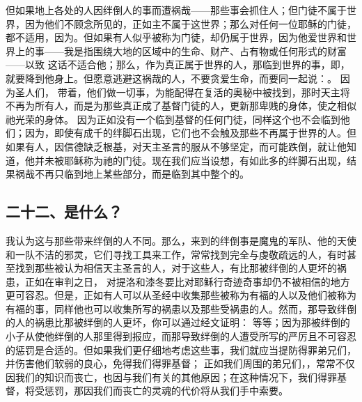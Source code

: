 但如果地上各处的人因绊倒人的事而遭祸哉——那些事会抓住人；但门徒不属于世界，因为他们不顾念所见的，正如主不属于这世界；那么对任何一位耶稣的门徒，都不适用，因为。但如果有人似乎被称为门徒，却仍属于世界，因为他爱世界和世界上的事——我是指围绕大地的区域中的生命、财产、占有物或任何形式的财富——以致 这话不适合他；那么，作为真正属于世界的人，那临到世界的事，即，就要降到他身上。但愿意逃避这祸哉的人，不要贪爱生命，而要同一起说：。 因为圣人们， 带着，他们做一切事，为能配得在复活的奥秘中被找到，那时天主将不再为所有人，而是为那些真正成了基督门徒的人，更新那卑贱的身体，使之相似祂光荣的身体。 因为正如没有一个临到基督的任何门徒，同样这个也不会临到他们；因为，即使有成千的绊脚石出现，它们也不会触及那些不再属于世界的人。但如果有人，因信德缺乏根基，对天主圣言的服从不够坚定，而可能跌倒，就让他知道，他并未被耶稣称为祂的门徒。现在我们应当设想，有如此多的绊脚石出现，结果祸哉不再只临到地上某些部分，而是临到其中整个的。\par


\subsection{二十二、是什么？}

 我认为这与那些带来绊倒的人不同。那么，来到的绊倒事是魔鬼的军队、他的天使和一队不洁的邪灵，它们寻找工具来工作，常常找到完全与虔敬疏远的人，有时甚至找到那些被认为相信天主圣言的人，对于这些人，有比那被绊倒的人更坏的祸患，正如在审判之日， 对提洛和漆冬要比对耶稣行奇迹奇事却仍不被相信的地方更可容忍。但是，正如有人可以从圣经中收集那些被称为有福的人以及他们被称为有福的事，同样他也可以收集所写的祸患以及那些受祸患的人。然而，那导致绊倒的人的祸患比那被绊倒的人更坏，你可以通过经文证明： 等等；因为那被绊倒的小子从使他绊倒的人那里得到报应，而那导致绊倒的人遭受所写的严厉且不可容忍的惩罚是合适的。但如果我们更仔细地考虑这些事，我们就应当提防得罪弟兄们，并伤害他们软弱的良心，免得我们得罪基督； 正如我们周围的弟兄们，，常常不仅因我们的知识而丧亡，也因与我们有关的其他原因；在这种情况下，我们得罪基督，将受惩罚，那因我们而丧亡的灵魂的代价将从我们手中索要。\par

